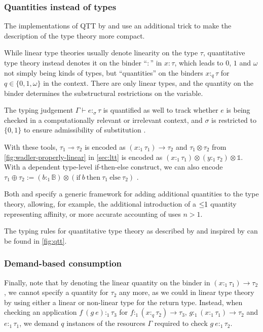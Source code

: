 \subsubsection{Quantities instead of types}
The implementations of QTT by \cite{mcbride_i_2016} and \cite{atkey_syntax_2018} use an additional trick to make the description of the type theory more compact. 

While linear type theories usually denote linearity on the type $\tau$, quantitative type theory instead denotes it on the binder ``$:$'' in $x : \tau$, which leads to $0$, $1$ and $\omega$ not simply being kinds of types, but ``quantities'' on the binders $x :_q \tau$ for $q \in \{0, 1, \omega\}$ in the context. There are only linear types, and the quantity on the binder determines the substructural restrictions on the variable. 

The typing judgement $\Gamma \vdash e :_\sigma \tau$ is quantified as well to track whether $e$ is being checked in a computationally relevant or irrelevant context, and $\sigma$ is restricted to $\{0, 1\}$ to ensure admissibility of substitution \citep{atkey_syntax_2018}. 

With these tools, $\tau_1 \multimap \tau_2$ is encoded as $(x :_1 \tau_1) \to \tau_2$ and $\tau_1 \otimes \tau_2$ from \cref{fig:wadler-properly-linear} in \cref{sec:ltt} is encoded as $(x :_1 \tau_1) \otimes (y :_1 \tau_2) \otimes \mathbb{1}$. With a dependent type-level if-then-else construct, we can also encode $\tau_1 \oplus \tau_2 := (b :_1 \mathbb{B}) \otimes (\mathrm{if}\ b\ \mathrm{then}\ \tau_1\ \mathrm{else}\ \tau_2)$ \citep{grenrus_dependent_2020}.

Both \cite{mcbride_i_2016} and \cite{atkey_syntax_2018} specify a generic framework for adding additional quantities to the type theory, allowing, for example, the additional introduction of a $\leq\hspace{-0.3em}1$ quantity representing affinity, or more accurate accounting of uses $n > 1$.

The typing rules for quantitative type theory as described by \cite{svoboda_additive_2021} and inspired by \cite{atkey_syntax_2018} can be found in \cref{fig:qtt}.

\subsubsection{Demand-based consumption}
Finally, note that by denoting the linear quantity on the binder in $(x :_1 \tau_1) \to \tau_2$, we cannot specify a quantity for $\tau_2$ any more, as we could in linear type theory by using either a linear or non-linear type for the return type. Instead, when checking an application $f\ (g\ e) :_1 \tau_3$ for $f :_1 (x :_q \tau_2) \to \tau_3$, $g :_1 (x :_1 \tau_1) \to \tau_2$ and $e :_1 \tau_1$, we demand $q$ instances of the resources $\Gamma$ required to check $g\ e :_1 \tau_2$. 


